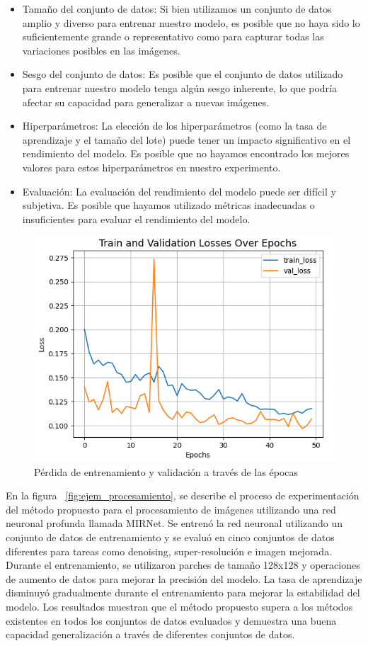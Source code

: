 \documentclass[a4paper,
               ]{jacow}
\begin{document}
\begin{itemize}[label=-]
  \item Tamaño del conjunto de datos: Si bien utilizamos un conjunto de datos amplio y diverso para entrenar nuestro modelo, es posible que no haya sido lo suficientemente grande o representativo como para capturar todas las variaciones posibles en las imágenes.
  \item Sesgo del conjunto de datos: Es posible que el conjunto de datos utilizado para entrenar nuestro modelo tenga algún sesgo inherente, lo que podría afectar su capacidad para generalizar a nuevas imágenes.
  \item Hiperparámetros: La elección de los hiperparámetros (como la tasa de aprendizaje y el tamaño del lote) puede tener un impacto significativo en el rendimiento del modelo. Es posible que no hayamos encontrado los mejores valores para estos hiperparámetros en nuestro experimento.
  \item Evaluación: La evaluación del rendimiento del modelo puede ser difícil y subjetiva. Es posible que hayamos utilizado métricas inadecuadas o insuficientes para evaluar el rendimiento del modelo.
\end{itemize}



\begin{figure}[!h]
    \centering
    \includegraphics*[width=.5\textwidth]{ll-train-losses-ep}
    \caption{Pérdida de entrenamiento y validación a través de las épocas}
    \label{fig:ll_train_losses_ep}
\end{figure}

En la figura ~\ref{fig:ejem_procesamiento}, se describe el proceso de experimentación del método propuesto para el procesamiento de imágenes utilizando una red neuronal profunda llamada MIRNet. Se entrenó la red neuronal utilizando un conjunto de datos de entrenamiento y se evaluó en cinco conjuntos de datos diferentes para tareas como denoising, super-resolución e imagen mejorada. Durante el entrenamiento, se utilizaron parches de tamaño 128x128 y operaciones de aumento de datos para mejorar la precisión del modelo. La tasa de aprendizaje disminuyó gradualmente durante el entrenamiento para mejorar la estabilidad del modelo. Los resultados muestran que el método propuesto supera a los métodos existentes en todos los conjuntos de datos evaluados y demuestra una buena capacidad generalización a través de diferentes conjuntos de datos.
\end{document}
